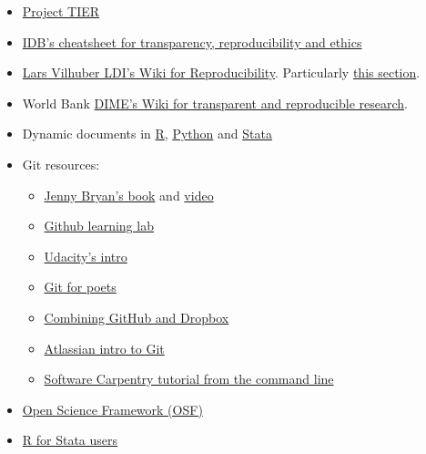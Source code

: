 \documentclass[]{book}
\providecommand{\tightlist}{%
  \setlength{\itemsep}{0pt}\setlength{\parskip}{0pt}}
\begin{document}
\begin{itemize}
\tightlist
\item
  \href{https://www.projecttier.org/tier-protocol/}{Project TIER}\\
\item
  \href{http://idbdocs.iadb.org/wsdocs/getdocument.aspx?docnum=EZSHARE-1350314980-383}{IDB's cheatsheet for transparency, reproducibility and ethics}\\
\item
  \href{https://github.com/labordynamicsinstitute/replicability-training/wiki}{Lars Vilhuber LDI's Wiki for Reproducibility}. Particularly \href{https://github.com/labordynamicsinstitute/replicability-training/wiki/Prepare_and_run_replication}{this section}.\\
\item
  World Bank \href{https://dimewiki.worldbank.org/wiki/Main_Page}{DIME's Wiki for transparent and reproducible research}.
\item
  Dynamic documents in \href{https://rmarkdown.rstudio.com/gallery.html}{R}, \href{https://github.com/jupyter/jupyter/wiki/A-gallery-of-interesting-Jupyter-Notebooks\#economics-and-finance}{Python} and \href{https://github.com/BITSS/CEGA2019/blob/master/03-extra_dynamic_docs/02b-Stata-markdown/Stata\%20Markdown.pdf}{Stata}\\
\item
  Git resources:

  \begin{itemize}
  \tightlist
  \item
    \href{https://happygitwithr.com}{Jenny Bryan's book} and \href{https://www.rstudio.com/resources/videos/happy-git-and-gihub-for-the-user-tutorial/}{video}\\
  \item
    \href{https://lab.github.com/}{Github learning lab}
  \item
    \href{https://www.udacity.com/course/how-to-use-git-and-github--ud775}{Udacity's intro}\\
  \item
    \href{https://www.youtube.com/playlist?list=PLRqwX-V7Uu6ZF9C0YMKuns9sLDzK6zoiV}{Git for poets}\\
  \item
    \href{https://github.com/kbjarkefur/GitHubDropBox}{Combining GitHub and Dropbox}\\
  \item
    \href{https://www.atlassian.com/git/tutorials}{Atlassian intro to Git}
  \item
    \href{https://swcarpentry.github.io/git-novice/}{Software Carpentry tutorial from the command line}
  \end{itemize}
\item
  \href{https://osf.io}{Open Science Framework (OSF)}
\item
  \href{https://github.com/hblackburn/R4Econ/blob/master/Resources.md}{R for Stata users}
\end{itemize}


\end{document}
